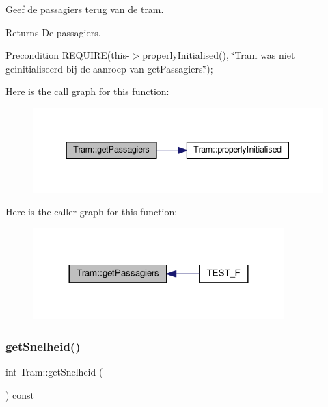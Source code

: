 Geef de passagiers terug van de tram. 

\begin{DoxyReturn}{Returns}
De passagiers. 
\end{DoxyReturn}
\begin{DoxyPrecond}{Precondition}
R\+E\+Q\+U\+I\+RE(this-\/$>$\hyperlink{class_tram_ac2688f590e4db232b4f535c9bf959efb}{properly\+Initialised()}, \char`\"{}\+Tram was niet geinitialiseerd bij de aanroep van get\+Passagiers.\char`\"{}); 
\end{DoxyPrecond}
Here is the call graph for this function\+:\nopagebreak
\begin{figure}[H]
\begin{center}
\leavevmode
\includegraphics[width=344pt]{class_tram_a678ba2cd0c6ab76e966947944f599d56_cgraph}
\end{center}
\end{figure}
Here is the caller graph for this function\+:\nopagebreak
\begin{figure}[H]
\begin{center}
\leavevmode
\includegraphics[width=276pt]{class_tram_a678ba2cd0c6ab76e966947944f599d56_icgraph}
\end{center}
\end{figure}
\mbox{\label{class_tram_aa8bcd980469801cb8524f170006f666c}} 
\subsubsection{\texorpdfstring{get\+Snelheid()}{getSnelheid()}}
{\footnotesize\ttfamily int Tram\+::get\+Snelheid (\begin{DoxyParamCaption}{ }\end{DoxyParamCaption}) const}



